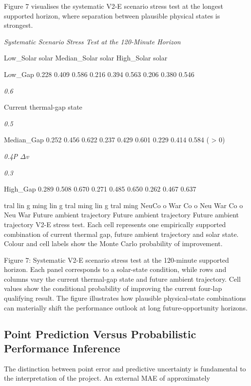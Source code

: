 Figure 7 visualises the systematic V2-E scenario stress test at the longest supported horizon, where separation between plausible physical states is strongest.

\begin{center}\textit{Systematic Scenario Stress Test at the 120-Minute Horizon}\end{center}

Low\_Solar solar Median\_Solar solar High\_Solar solar

Low\_Gap 0.228 0.409 0.586 0.216 0.394 0.563 0.206 0.380 0.546

\begin{center}\textit{0.6}\end{center}

Current thermal-gap state

\begin{center}\textit{0.5}\end{center}

Median\_Gap 0.252 0.456 0.622 0.237 0.429 0.601 0.229 0.414 0.584 ( > 0)

\begin{center}\textit{0.4P \ensuremath{\Delta}v}\end{center}

\begin{center}\textit{0.3}\end{center}

High\_Gap 0.289 0.508 0.670 0.271 0.485 0.650 0.262 0.467 0.637

tral lin g ming lin g tral ming lin g tral ming NeuCo o War Co o Neu War Co o Neu War Future ambient trajectory Future ambient trajectory Future ambient trajectory V2-E stress test. Each cell represents one empirically supported combination of current thermal gap, future ambient trajectory and solar state. Colour and cell labels show the Monte Carlo probability of improvement.

Figure 7: Systematic V2-E scenario stress test at the 120-minute supported horizon. Each panel corresponds to a solar-state condition, while rows and columns vary the current thermal-gap state and future ambient trajectory. Cell values show the conditional probability of improving the current four-lap qualifying result. The figure illustrates how plausible physical-state combinations can materially shift the performance outlook at long future-opportunity horizons.

\subsection{Point Prediction Versus Probabilistic Performance Inference}
The distinction between point error and predictive uncertainty is fundamental to the interpretation of the project. An external MAE of approximately

